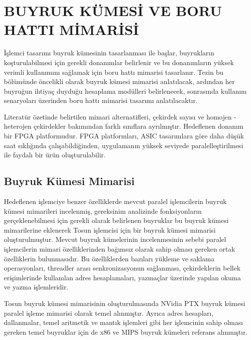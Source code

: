 \chapter{BUYRUK KÜMESİ VE BORU HATTI MİMARİSİ}
İşlemci tasarımı buyruk kümesinin tasarlanması ile başlar, buyrukların koşturulabilmesi için gerekli donanımlar belirlenir ve bu donanımların yüksek verimli kullanımını sağlamak için boru hattı mimarisi tasarlanır. Tezin bu bölümünde öncelikli olarak buyruk kümesi mimarisi anlatılacak, ardından her buyruğun ihtiyaç duyduğu hesaplama modülleri belirlenecek, sonrasında kullanım senaryoları üzerinden boru hattı mimarisi tasarımı anlatılacaktır. \par

Literatür özetinde belirtilen mimari alternatifleri, çekirdek sayısı ve homojen - heterojen çekirdekler bakımından farklı sınıflara ayrılmıştır. Hedeflenen donanım bir FPGA platformudur. FPGA platformları, ASIC tasarımlara göre daha düşük saat sıklığında çalışabildiğinden, uygulamanın yüksek seviyede paralelleştirilmesi ile faydalı bir ürün oluşturulabilir. \par

\section{Buyruk Kümesi Mimarisi}
Hedeflenen işlemciye benzer özelliklerde mevcut paralel işlemcilerin buyruk kümesi mimarileri incelenmiş, gereksinim analizinde fonksiyonların gerçeklenebilmesi için gerekli olarak belirlenen buyruklar bu buyruk kümesi mimarilerine eklenerek Tosun işlemcisi için bir buyruk kümesi mimarisi oluşturulmuştur. Mevcut buyruk kümelerinin incelenmesinin sebebi paralel işlemcilerin mimari özelliklerinden bağımsız olarak sahip olması gereken ortak özelliklerin bulunmasıdır. Bu özelliklerden bazıları yükleme ve saklama operasyonları, threadler arası senkronizasyonun sağlanması, çekirdeklerin bellek erişimlerinde kullanılan adres hesaplamaları, yazmaçlar üzerinde yapılan okuma ve yazma işlemleridir. \par

Tosun buyruk kümesi mimarisinin oluşturulmasında NVidia PTX \cite{nvidiaPTXISA} buyruk kümesi paralel işleme mimarisi olarak temel alınmıştır. Ayrıca adres hesapları, dallanmalar, temel aritmetik ve mantık işlemleri gibi her işlemcinin sahip olması gereken temel buyruklar için de x86 \cite{x86ISA} ve MIPS \cite{MIPSISA} buyruk kümeleri referans alınmıştır. \par

